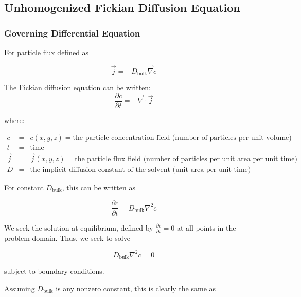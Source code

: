
\subsection{Unhomogenized Fickian Diffusion Equation}\label{subsec:unhom_fick}

\subsubsection{Governing Differential Equation}\label{subsubsec:unhom_fick_gov}
For particle flux defined as 

\begin{equation}
\vec{j} = - D_{\mathrm{bulk}} \vec{\nabla} c
\end{equation}

The Fickian diffusion equation can be written:
\begin{equation}
\frac{\partial c}{\partial t} = - \vec{\nabla} \cdot \vec{j}
\end{equation}

where:

$\begin{array}{rcl}
c & = & c(x,y,z) = \text{the particle concentration field (number of particles per unit volume)} \\
t & = & \text{time} \\
\vec{j} & = & \vec{j}(x,y,z) = \text{the particle flux field (number of particles per unit area per unit time)} \\
D & = & \text{the implicit diffusion constant of the solvent (unit area per unit time)}
\end{array}$

For constant $D_{\mathrm{bulk}}$, this can be written as

\begin{equation}
\frac{\partial c}{\partial t} = D_{\mathrm{bulk}} \nabla^2 c
\end{equation}

We seek the solution at equilibrium, defined by
$\frac{\partial c}{\partial t} = 0$ at all points in the problem domain.
Thus, we seek to solve

\begin{equation}
D_{\mathrm{bulk}} \nabla^2 c = 0
\end{equation}

subject to boundary conditions.

Assuming $D_{\mathrm{bulk}}$ is any nonzero constant, this is clearly the same as

